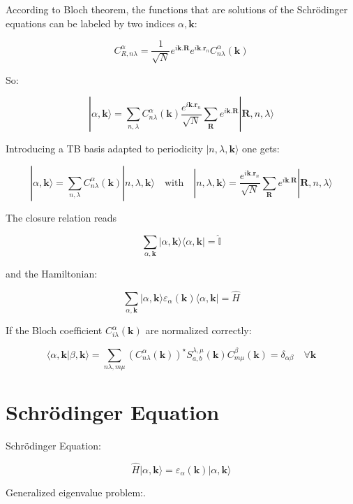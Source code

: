 \documentclass{article}
\newcommand{\bra}[1]{\langle #1|}
\newcommand{\ket}[1]{|#1\rangle}
\newcommand{\braket}[2]{\langle #1|#2\rangle}
\newcommand{\op}[1]{\hat{#1}}
\begin{document}
\noindent
According to Bloch theorem, the functions that are solutions of the Schrödinger equations can be labeled by two indices $\alpha, \mathbf{k}$:

\[ \displaystyle C_{R,n \lambda}^{\alpha}=\frac{1}{\sqrt{N}}e^{i  \mathbf{k}.\mathbf{R}}e^{i \mathbf{k}.\mathbf{r}_n} C_{n \lambda}^{\alpha}(\mathbf{k})\]

\noindent
So:

\[\displaystyle \ket{\alpha, \mathbf{k}}=\sum_{n,\lambda} C_{n \lambda}^{\alpha}(\mathbf{k})
\frac{e^{i \mathbf{k}.\mathbf{r}_n}}{\sqrt{N}} \sum_{\mathbf{R}} e^{i \mathbf{k}.\mathbf{R}} \ket{\mathbf{R},n,\lambda } \]

\noindent Introducing a TB basis adapted to periodicity $|n,\lambda, \mathbf{k} \rangle$ one gets:

\[\displaystyle \ket{\alpha, \mathbf{k} }=\sum_{n,\lambda} C_{n \lambda}^{\alpha}(\mathbf{k})\ket{n,\lambda,\mathbf{k}}
\quad \mbox{with} \quad \displaystyle 
\ket{n,\lambda,\mathbf{k}}=\frac{e^{i \mathbf{k}.\mathbf{r}_n}}{\sqrt{N}} \sum_{\mathbf{R}} e^{i \mathbf{k}.\mathbf{R}} \ket{\mathbf{R},n,\lambda }\]

\noindent
The closure relation reads

\[\displaystyle \sum_{\alpha,\mathbf{k}} \ket{\alpha,\mathbf{k}}  \bra{\alpha,\mathbf{k}}=\op{\mathbb{I}}\]

\noindent
and the Hamiltonian:

\[ \sum_{\alpha,\mathbf{k}} \ket{\alpha,\mathbf{k}} \varepsilon_{\alpha}(\mathbf{k}) \bra{\alpha,\mathbf{k}}=\op{H}\]


\noindent
If the Bloch coefficient $C_{i \lambda}^{\alpha}(\mathbf{k})$ are normalized correctly:

\[ \braket{\alpha,\mathbf{k}}{\beta,\mathbf{k}}=
\sum_{n \lambda,m \mu} (C_{n \lambda}^{\alpha}(\mathbf{k}))^{\star} S_{a,b}^{\lambda,\mu}(\mathbf{k})C_{m \mu}^{\beta}(\mathbf{k})=\delta_{\alpha \beta}
\quad \forall \mathbf{k} \]


\section{Schr\"odinger Equation}

\noindent
Schr\"odinger Equation:

\[\displaystyle \op{H} \ket{\alpha, \mathbf{k} }=\varepsilon_{\alpha}(\mathbf{k}) \ket{\alpha, \mathbf{k} }\]

\noindent
Generalized eigenvalue problem:.
\end{document}
